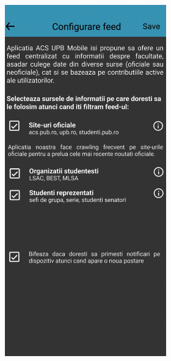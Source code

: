 \begin{figure}[!ht]
    \centering
    \begin{minipage}[t]{0.4\textwidth}
        \captionsetup{justification=centering}
        \includegraphics[width=\textwidth]{figures/app/initial/select-sources-draft.png}

\end{minipage}
\end{figure}
